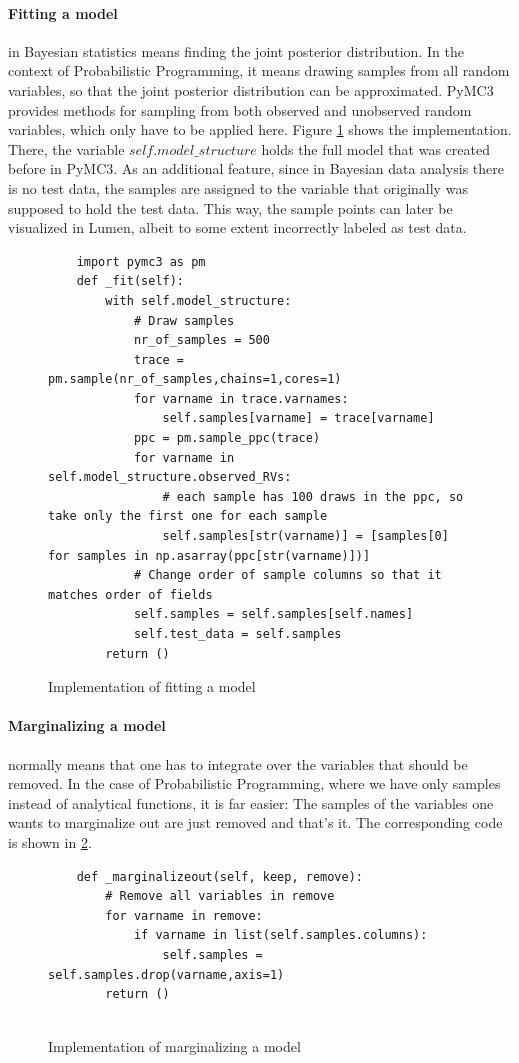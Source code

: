 \documentclass{article}
\begin{document}
\paragraph{Fitting a model} in Bayesian statistics means finding the joint posterior distribution. In the context of Probabilistic Programming, it means drawing samples from all random variables, so that the joint posterior distribution can be approximated. PyMC3 provides methods for sampling from both observed and unobserved random variables, which only have to be applied here. Figure \ref{fig:code_fitting_a_model} shows the implementation. There, the variable $self.model\_structure$ holds the full model that was created before in PyMC3. As an additional feature, since in Bayesian data analysis there is no test data, the samples are assigned to the variable that originally was supposed to hold the test data. This way, the sample points can later be visualized in Lumen, albeit to some extent incorrectly labeled as test data.
\begin{figure}[h]
	\begin{lstlisting}
	import pymc3 as pm
    def _fit(self):
		with self.model_structure:
			# Draw samples
			nr_of_samples = 500
			trace = pm.sample(nr_of_samples,chains=1,cores=1)
			for varname in trace.varnames:
				self.samples[varname] = trace[varname]
			ppc = pm.sample_ppc(trace)
			for varname in self.model_structure.observed_RVs:
				# each sample has 100 draws in the ppc, so take only the first one for each sample
				self.samples[str(varname)] = [samples[0] for samples in np.asarray(ppc[str(varname)])]			
			# Change order of sample columns so that it matches order of fields
			self.samples = self.samples[self.names]
			self.test_data = self.samples
		return ()

	\end{lstlisting}
	\caption[Implementation of fitting a model]{Implementation of fitting a model}
	\label{fig:code_fitting_a_model}
\end{figure}

\paragraph{Marginalizing a model} normally means that one has to integrate over the variables that should be removed. In the case of Probabilistic Programming, where we have only samples instead of analytical functions, it is far easier: The samples of the variables one wants to marginalize out are just removed and that's it. The corresponding code is shown in \ref{fig:code_marginalizing_a_model}.
\begin{figure}[h]
	\begin{lstlisting}
    def _marginalizeout(self, keep, remove):
		# Remove all variables in remove
		for varname in remove:
			if varname in list(self.samples.columns):
				self.samples = self.samples.drop(varname,axis=1)
		return ()
	
	\end{lstlisting}
	\caption[Implementation of marginalizing a model]{Implementation of marginalizing a model}
	\label{fig:code_marginalizing_a_model}
\end{figure}
\end{document}
